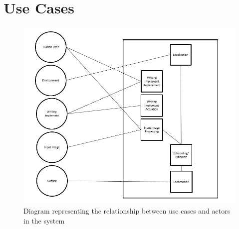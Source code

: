 
\section{Use Cases}
\label{sec:use_cases}

\begin{figure}
 \centering
  \includegraphics[width=0.6\columnwidth]{diagrams/use-cases-diagram.jpg}
	\caption{Diagram representing the relationship between use cases and actors in the system}
 \label{fig:use-cases}
\end{figure}

